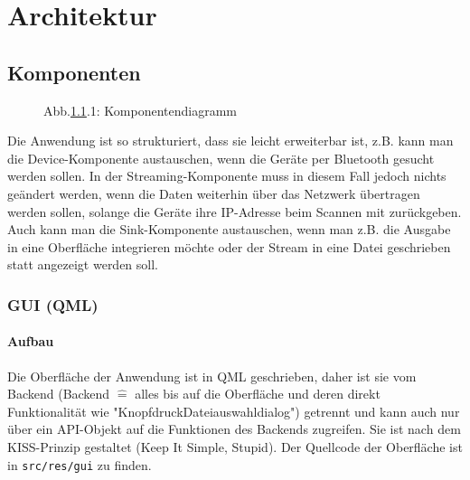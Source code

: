 \documentclass{article}
\begin{document}
    \newpage

    \section{Architektur}\label{sec:architektur}

    \subsection{Komponenten}\label{subsec:komponenten}

    \begin{figure}[!h]
        \centering
        {
        \svgfont
        \resizebox{\textwidth}{!}{}
        }
        \caption*{Abb.\ref{subsec:komponenten}.1: Komponentendiagramm}
    \end{figure}

    Die Anwendung ist so strukturiert, dass sie leicht erweiterbar ist, z.B.
    kann man die Device-Komponente austauschen, wenn die Geräte per Bluetooth gesucht werden sollen.
    In der Streaming-Komponente muss in diesem Fall jedoch nichts geändert werden, wenn die
    Daten weiterhin über das Netzwerk übertragen werden sollen, solange die Geräte ihre IP-Adresse beim Scannen mit zurückgeben.
    Auch kann man die Sink-Komponente austauschen, wenn man z.B. die Ausgabe in eine Oberfläche integrieren möchte oder
    der Stream in eine Datei geschrieben statt angezeigt werden soll.

    \subsubsection{GUI (QML)}\label{subsubsec:gui-(qml)}

    \paragraph{Aufbau}
    Die Oberfläche der Anwendung ist in QML geschrieben, daher ist sie vom Backend
    (Backend $\hat=$ alles bis auf die Oberfläche und deren direkt Funktionalität wie "Knopfdruck\textrightarrow Dateiauswahldialog")
    getrennt und kann auch nur über ein API-Objekt auf die Funktionen des Backends zugreifen.
    Sie ist nach dem KISS-Prinzip gestaltet (Keep It Simple, Stupid).
    Der Quellcode der Oberfläche ist in \texttt{src/res/gui} zu finden.
\end{document}
